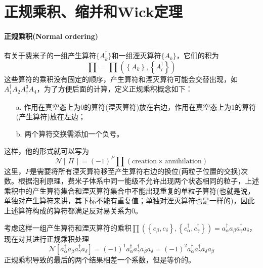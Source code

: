 \section{正规乘积、缩并和Wick定理}

\paragraph*{正规乘积(Normal ordering)}
有关于费米子的一组产生算符$\{A^{\dagger}_{k}\}$和一组湮灭算符$\{A_k\}$，它们的积为
\begin{equation}
    \prod = \prod \left(\left\{A_k\right\}, \left\{A^{\dagger}_l\right\}\right)
\end{equation}
这些算符的乘积没有固定的顺序，产生算符和湮灭算符可能会交替出现，如$A_1^\dagger A_2 A^3_\dagger A_4$，为了方便后面的计算，定义正规乘积概念如下：
\begin{enumerate}[topsep=1pt,itemsep=0pt]
	\item [a.] 作用在真空态上为0的算符(湮灭算符)放在右边，作用在真空态上为1的算符(产生算符)放在左边；
	\item [b.] 两个算符交换需添加一个负号。
\end{enumerate}
这样，他的形式就可以写为
\begin{equation}
    \mathcal{N}[\,\Pi \,] = (-1)^{P} \prod \left(\text{creation} \times \text{annihilation}\right)
\end{equation}
这里，$P$是需要将所有湮灭算符移至产生算符右边的换位(两粒子位置的交换)次数。根据泡利原理，费米子体系中同一能级不允许出现两个状态相同的粒子，上述乘积中的产生算符集合和湮灭算符集合中不能出现重复的单粒子算符(也就是说，单独对产生算符来讲，其下标不能有重复值；单独对湮灭算符也是一样的)，因此上述算符构成的算符都满足反对易关系为0。
\begin{example}
    考虑这样一组产生算符和湮灭算符的乘积$\prod(\left\{c_\beta, c_\delta\right\}, \left\{c_{\alpha}^{\dagger}, c_{\gamma}^{\dagger}\right\}) = a_{\alpha}^{\dagger} a_{\beta} a_{\gamma}^{\dagger} a_{\delta}$，现在对其进行正规乘积处理
    \begin{equation}
        \mathcal{N}\left[a_{\alpha}^{\dagger} a_{\beta} a_{\gamma}^{\dagger} a_{\delta}\right] = (-1)^{1} a_{\alpha}^{\dagger} a_{\gamma}^{\dagger} a_{\beta} a_{\delta} = (-1)^{2} a_{\alpha}^{\dagger} a_{\gamma}^{\dagger} a_{\delta} a_{\beta}
    \end{equation} 
    正规乘积导致的最后的两个结果相差一个系数，但是等价的。
\end{example}


